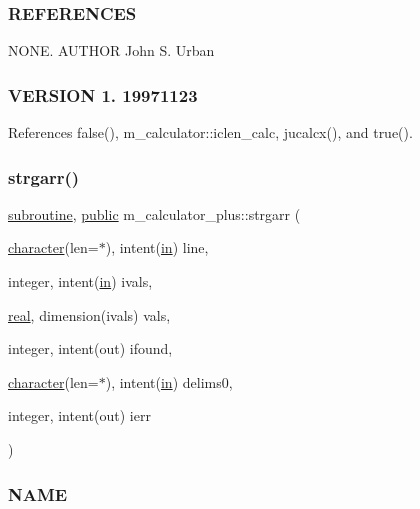 \subsubsection*{R\+E\+F\+E\+R\+E\+N\+C\+ES}

N\+O\+NE. A\+U\+T\+H\+OR John S. Urban \subsubsection*{V\+E\+R\+S\+I\+ON 1. 19971123}

References false(), m\+\_\+calculator\+::iclen\+\_\+calc, jucalcx(), and true().

\mbox{\label{namespacem__calculator__plus_a4d3424e0cb74d4af53e7f59c07d31f1b}} 
\subsubsection{\texorpdfstring{strgarr()}{strgarr()}}
{\footnotesize\ttfamily \hyperlink{M__stopwatch_83_8txt_acfbcff50169d691ff02d4a123ed70482}{subroutine}, \hyperlink{M__stopwatch_83_8txt_a2f74811300c361e53b430611a7d1769f}{public} m\+\_\+calculator\+\_\+plus\+::strgarr (\begin{DoxyParamCaption}\item[{\hyperlink{option__stopwatch_83_8txt_abd4b21fbbd175834027b5224bfe97e66}{character}(len=$\ast$), intent(\hyperlink{M__journal_83_8txt_afce72651d1eed785a2132bee863b2f38}{in})}]{line,  }\item[{integer, intent(\hyperlink{M__journal_83_8txt_afce72651d1eed785a2132bee863b2f38}{in})}]{ivals,  }\item[{\hyperlink{read__watch_83_8txt_abdb62bde002f38ef75f810d3a905a823}{real}, dimension(ivals)}]{vals,  }\item[{integer, intent(out)}]{ifound,  }\item[{\hyperlink{option__stopwatch_83_8txt_abd4b21fbbd175834027b5224bfe97e66}{character}(len=$\ast$), intent(\hyperlink{M__journal_83_8txt_afce72651d1eed785a2132bee863b2f38}{in})}]{delims0,  }\item[{integer, intent(out)}]{ierr }\end{DoxyParamCaption})}



\subsubsection*{N\+A\+ME}

